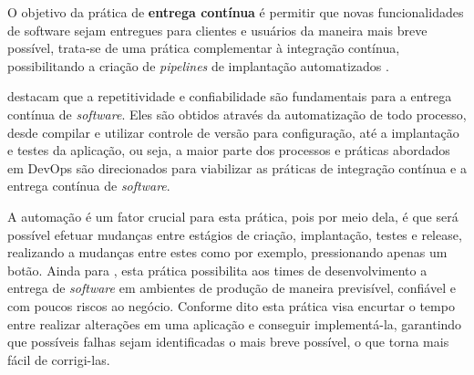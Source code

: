 \documentclass[twoside,english,brazilian]{UNISINOSartigo}
\begin{document}
O objetivo da prática de \textbf{entrega contínua} é permitir que novas funcionalidades de software sejam entregues para clientes e usuários da maneira mais breve possível, trata-se de uma prática complementar à integração contínua, possibilitando a criação de \textit{pipelines} de implantação automatizados \cite{Sharma2014}.

 destacam que a repetitividade e confiabilidade são fundamentais para a entrega contínua de \textit{software}. Eles são obtidos através da automatização de todo processo, desde compilar e utilizar controle de versão para configuração, até a implantação e testes da aplicação, ou seja, a maior parte dos processos e práticas abordados em DevOps são direcionados para viabilizar as práticas de integração contínua e a entrega contínua de \textit{software}.

A automação é um fator crucial para esta prática, pois por meio dela, é que será possível efetuar mudanças entre estágios de criação, implantação, testes e release, realizando a mudanças entre estes como por exemplo, pressionando apenas um botão. 
Ainda para , esta prática possibilita aos times de desenvolvimento a entrega de \textit{software} em ambientes de produção de maneira previsível, confiável e com poucos riscos ao negócio. Conforme dito esta prática visa encurtar o tempo entre realizar alterações em uma aplicação e conseguir implementá-la, garantindo que possíveis falhas sejam identificadas o mais breve possível, o que torna mais fácil de corrigi-las.
\end{document}
